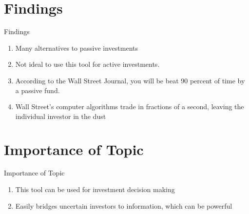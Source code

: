 \documentclass[handout,t]{beamer}
\begin{document}
    \section{Findings}
        \begin{frame}{Findings}
        	\begin{doublespacing}
            	\begin{enumerate}
            	    \item Many alternatives to passive investments
            	    \item Not ideal to use this tool for active investments. 
            	    \item According to the Wall Street Journal, you will be beat 90 percent of time by a passive fund.
            	    \item Wall Street's computer algorithms trade in fractions of a second, leaving the individual investor in the dust
            	\end{enumerate}
            \end{doublespacing}
        \end{frame}
        
    \section{Importance of Topic}
        \begin{frame}{Importance of Topic}
        	\begin{doublespacing}
            	\begin{enumerate}
                    \item This tool can be used for investment decision making
                    \item Easily bridges uncertain investors to information, which can be powerful
            	\end{enumerate}
            \end{doublespacing}
        \end{frame}
    
    
\end{document}

